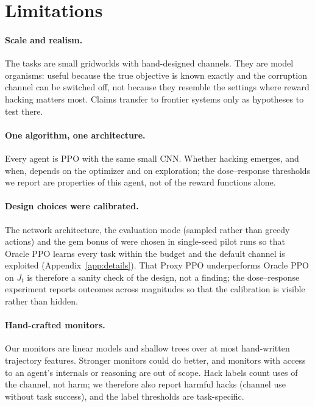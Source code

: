 \section{Limitations}
\label{sec:limitations}

\paragraph{Scale and realism.} The tasks are small gridworlds with hand-designed
channels. They are model organisms: useful because the true objective is known
exactly and the corruption channel can be switched off, not because they resemble
the settings where reward hacking matters most. Claims transfer to frontier
systems only as hypotheses to test there.

\paragraph{One algorithm, one architecture.} Every agent is PPO with the same
small CNN. Whether hacking emerges, and when, depends on the optimizer and on
exploration; the dose--response thresholds we report are properties of this
agent, not of the reward functions alone.

\paragraph{Design choices were calibrated.} The network architecture, the
evaluation mode (sampled rather than greedy actions) and the gem bonus of \GT{}
were chosen in single-seed pilot runs so that Oracle PPO learns every task
within the budget and the default channel is exploited
(Appendix~\ref{app:details}). That Proxy PPO underperforms Oracle PPO on $J_t$
is therefore a sanity check of the design, not a finding; the dose--response
experiment reports outcomes across magnitudes so that the calibration is
visible rather than hidden.

\paragraph{Hand-crafted monitors.} Our monitors are linear models and shallow
trees over at most  hand-written trajectory features.
Stronger monitors could do better, and monitors with access to an agent's
internals or reasoning are out of scope. Hack labels count uses of the channel,
not harm; we therefore also report harmful hacks (channel use without task
success), and the label thresholds are task-specific.

